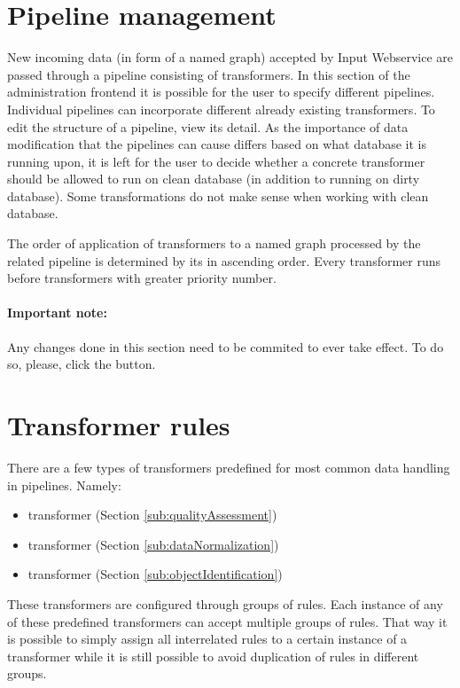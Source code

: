 \section{Pipeline management}
\label{sec:pipelineManagement}

	New incoming data (in form of a named graph) accepted by Input Webservice are passed through a {pipeline} consisting of {transformers}. In this section of the administration frontend it is possible for the user to specify different {pipelines}. Individual {pipelines} can incorporate different already existing {transformers}. To edit the structure of a {pipeline}, view its detail. As the importance of data modification that the pipelines can cause differs based on what database it is running upon, it is left for the user to decide whether a concrete {transformer} should be allowed to run on clean database (in addition to running on dirty database). Some transformations do not make sense when working with clean database.
	
	The order of application of {transformers} to a named graph processed by the related {pipeline} is determined by its  in ascending order. Every {transformer} runs before {transformers} with greater priority number.

\paragraph{Important note:} Any changes done in this section need to be commited to ever take effect. To do so, please, click the  button.

\section{Transformer rules}
\label{sec:transformerRules}

	There are a few types of {transformers} predefined for most common data handling in pipelines. Namely:
	\begin{itemize}
		\item {} {transformer} (Section \ref{sub:qualityAssessment})
		\item {} {transformer}  (Section \ref{sub:dataNormalization})
		\item {} {transformer} (Section \ref{sub:objectIdentification})
	\end{itemize}
	
	These {transformers} are configured through groups of rules. Each instance of any of these predefined {transformers} can accept multiple groups of rules. That way it is possible to simply assign all interrelated rules to a certain instance of a transformer while it is still possible to avoid duplication of rules in different groups.

